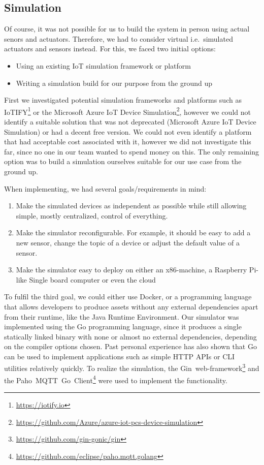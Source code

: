 \subsection{Simulation}\label{subsec:simulation}

Of course, it was not possible for us to build the system in person
using actual senors and actuators.
Therefore, we had to consider virtual
i.e.~simulated actuators and sensors instead.
For this, we faced two
initial options:
\begin{itemize}
    \item Using an existing IoT simulation framework or platform
    \item Writing a simulation build for our purpose from the ground up
\end{itemize}

First we investigated potential simulation frameworks and platforms such
as IoTIFY\footnote{\url{https://iotify.io}} or the Microsoft Azure IoT Device Simulation\footnote{\url{https://github.com/Azure/azure-iot-pcs-device-simulation}}, however we could
not identify a suitable solution that was not deprecated (Microsoft
Azure IoT Device Simulation) or had a decent free version.
We could not
even identify a platform that had acceptable cost associated with it,
however we did not investigate this far, since no one in our team wanted
to spend money on this.
The only remaining option was to build a
simulation ourselves suitable for our use case from the ground up.

When implementing, we had several goals/requirements in mind:
\begin{enumerate}
    \item
    Make the simulated devices as independent as possible while still
    allowing simple, mostly centralized, control of everything.
    \item
    Make the simulator reconfigurable.
    For example, it should be easy to
    add a new sensor, change the topic of a device or adjust the default
    value of a sensor.
    \item
    Make the simulator easy to deploy on either an x86-machine, a
    Raspberry Pi-like Single board computer or even the cloud
\end{enumerate}

To fulfil the third goal, we could either use Docker, or a programming
language that allows developers to produce assets without any
external dependencies apart from their runtime, like the Java Runtime
Environment.
Our simulator was implemented using the Go programming
language, since it produces a single statically linked binary with none
or almost no external dependencies, depending on the compiler options
chosen.
Past personal experience has also shown that Go can be used to
implement applications such as simple HTTP APIs or CLI utilities
relatively quickly.
To realize the simulation, the Gin~web-framework\footnote{\url{https://github.com/gin-gonic/gin}} and the Paho~MQTT~Go~Client\footnote{\url{https://github.com/eclipse/paho.mqtt.golang}} were used to implement the
functionality.

